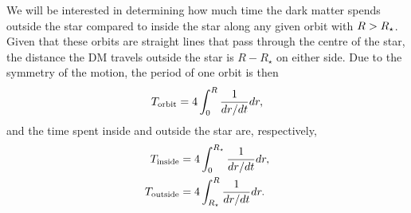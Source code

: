 We will be interested in determining how much time the dark matter spends outside the star compared to inside the star along any given orbit with $R>R_\star$.
Given that these orbits are straight lines that pass through the centre of the star, the distance the DM travels outside the star is $R - R_\star$ on either side. 
Due to the symmetry of the motion, the period of one orbit is then
\begin{equation}
    T_{\rm orbit} = 4 \int_0^R \frac{1}{dr/dt}dr,
\end{equation}
and the time spent inside and outside the star are, respectively,
\begin{align}
    T_{\rm inside} & = 4 \int_0^{R_\star} \frac{1}{dr/dt}dr, \label{app:eq:timeinside}\\
    T_{\rm outside} & = 4 \int_{R_\star}^R \frac{1}{dr/dt}dr. \label{app:eq:timeoutside}
\end{align}





